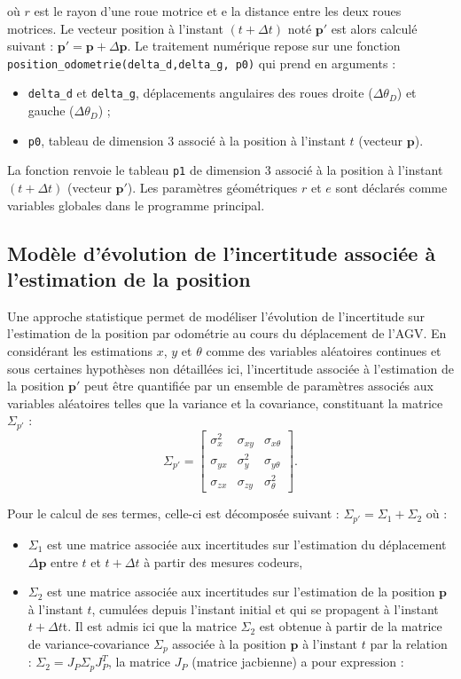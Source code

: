où $r$ est le rayon d’une roue motrice et e la distance entre les deux roues motrices.
Le vecteur position à l’instant $(t + \Delta t)$ noté $\bm{p'}$ est alors calculé suivant : $\bm{p'}=\bm{p}+\Delta \bm{p}$.
Le traitement numérique repose sur une fonction \lstinline{position_odometrie(delta_d,delta_g, p0)}
qui prend en arguments :
\begin{itemize}
\item \lstinline{delta_d} et \lstinline{delta_g}, déplacements angulaires des roues droite ($\Delta \theta_D$) et gauche ($\Delta \theta_D$) ;
\item \lstinline{p0}, tableau de dimension 3 associé à la position à l’instant $t$ (vecteur $\bm{p}$).
\end{itemize}
La fonction renvoie le tableau \lstinline{p1} de dimension 3 associé à la position à l’instant $(t + \Delta t)$ (vecteur $\bm{p'}$). Les paramètres géométriques $r$ et $e$ sont déclarés comme variables globales dans le programme principal.



\subsection*{Modèle d’évolution de l’incertitude associée à l’estimation de la position}
Une approche statistique permet de modéliser l’évolution de l’incertitude sur l’estimation de la position par odométrie au cours du déplacement de l’AGV. En considérant les estimations $x$, $y$ et $\theta$ comme
des variables aléatoires continues et sous certaines hypothèses non détaillées ici, l’incertitude associée à l’estimation de la position $\bm{p'}$ peut être quantifiée par un ensemble de paramètres associés aux
variables aléatoires telles que la variance et la covariance, constituant la matrice $\Sigma_{p'}$ :
$$
\Sigma_{p'}
=
\begin{bmatrix}
\sigma_x^2 	& \sigma_{xy} 	& \sigma_{x\theta} \\
\sigma_{yx} 	& \sigma_y^2 	& \sigma_{y\theta} \\
\sigma_{zx} 	& \sigma_{zy} 	& \sigma_{\theta}^2
\end{bmatrix}
.$$

Pour le calcul de ses termes, celle-ci est décomposée suivant : 
$\Sigma_{p'} = \Sigma_1 + \Sigma_2$
où :
\begin{itemize}
\item $\Sigma_1$ est une matrice associée aux incertitudes sur l’estimation du déplacement $\Delta \bm{p} $ entre $t$ et $t+\Delta t$ à partir des mesures codeurs,
\item $\Sigma_2$ est une matrice associée aux incertitudes sur l’estimation de la position $\bm{p}$ à l’instant $t$,
cumulées depuis l’instant initial et qui se propagent à l’instant $t+\Delta t$t. Il est admis ici que la
matrice $\Sigma_2$ est obtenue à partir de la matrice de variance-covariance $\Sigma_p$  associée à la position $\bm{p}$ à l’instant $t$ par la relation :
$\Sigma_2 = J_P \Sigma_p J_P^T$, la matrice $J_P$ (matrice jacbienne) a pour expression : 
\end{itemize}


